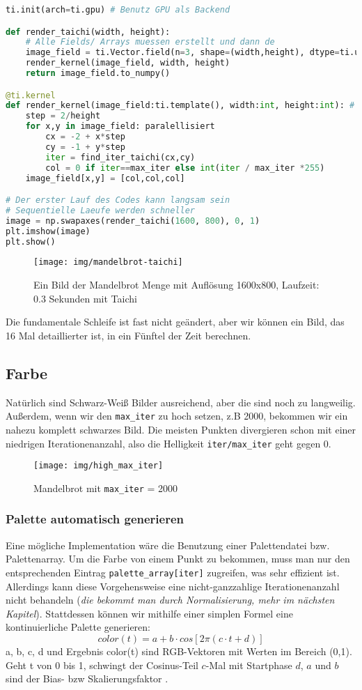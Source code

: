\documentclass{article}
\begin{document}
\begin{lstlisting}[language=python]
ti.init(arch=ti.gpu) # Benutz GPU als Backend

def render_taichi(width, height):
	# Alle Fields/ Arrays muessen erstellt und dann de
	image_field = ti.Vector.field(n=3, shape=(width,height), dtype=ti.uint32)
	render_kernel(image_field, width, height)
	return image_field.to_numpy()

@ti.kernel
def render_kernel(image_field:ti.template(), width:int, height:int): # type:ignore
	step = 2/height
	for x,y in image_field: paralellisiert
		cx = -2 + x*step
		cy = -1 + y*step
		iter = find_iter_taichi(cx,cy)
		col = 0 if iter==max_iter else int(iter / max_iter *255)
	image_field[x,y] = [col,col,col]

# Der erster Lauf des Codes kann langsam sein
# Sequentielle Laeufe werden schneller
image = np.swapaxes(render_taichi(1600, 800), 0, 1)
plt.imshow(image)
plt.show()
\end{lstlisting}
\begin{figure}[!htb]
	\centering
	\texttt{[image: img/mandelbrot-taichi]}
	\caption{Ein Bild der Mandelbrot Menge mit Auflösung 1600x800, Laufzeit: 0.3 Sekunden mit Taichi}
	\label{fig:mandelbrot-taichi}
\end{figure}
Die fundamentale Schleife ist fast nicht geändert, aber wir können ein Bild, das 16 Mal detaillierter ist, in ein Fünftel der Zeit berechnen. 

\subsection{Farbe}
Natürlich sind Schwarz-Weiß Bilder ausreichend, aber die sind noch zu langweilig. Außerdem, wenn wir den \lstinline|max_iter| zu hoch setzen, z.B 2000, bekommen wir ein nahezu komplett schwarzes Bild. Die meisten Punkten divergieren schon mit einer niedrigen Iterationenanzahl, also die Helligkeit \lstinline|iter/max_iter| geht gegen 0.
\begin{figure}
\centering
\texttt{[image: img/high\_max\_iter]}
\caption{Mandelbrot mit \lstinline|max_iter| = 2000}
\label{fig:highmaxiter}
\end{figure}

\subsubsection{Palette automatisch generieren}
Eine mögliche Implementation wäre die Benutzung einer Palettendatei bzw. Palettenarray. Um die Farbe von einem Punkt zu bekommen, muss man nur den entsprechenden Eintrag \lstinline|palette_array[iter]| zugreifen, was sehr effizient ist. Allerdings kann diese Vorgehensweise eine nicht-ganzzahlige Iterationenanzahl nicht behandeln (\textit{die bekommt man durch Normalisierung, mehr im nächsten Kapitel}). Stattdessen können wir mithilfe einer simplen Formel eine kontinuierliche Palette generieren:
$$color(t) = a + b \cdot cos[ 2\pi(c \cdot t+d)] $$
a, b, c, d und Ergebnis color(t) sind RGB-Vektoren mit Werten im Bereich (0,1). Geht t von 0 bis 1, schwingt der Cosinus-Teil $c$-Mal mit Startphase $d$, $a$ und $b$ sind der Bias- bzw Skalierungsfaktor \cite{quilez}. 
\end{document}
